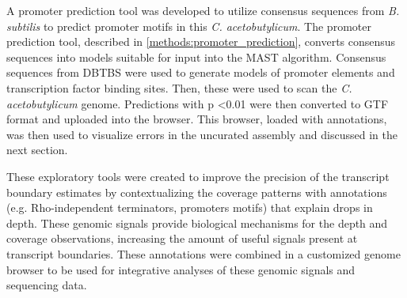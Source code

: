 A promoter prediction tool was developed to utilize consensus sequences from \textit{B. subtilis}\cite{189} to predict promoter motifs in this \textit{C. acetobutylicum}. The promoter prediction tool, described in \ref{methods:promoter_prediction}, converts consensus sequences into models suitable for input into the MAST algorithm.\cite{5} Consensus sequences from DBTBS\cite{189} were used to generate models of promoter elements and transcription factor binding sites. Then, these were used to scan the \textit{C. acetobutylicum} genome. Predictions with p \textless 0.01 were then converted to GTF format and uploaded into the browser. This browser, loaded with annotations, was then used to visualize errors in the uncurated assembly and discussed in the next section.

These exploratory tools were created to improve the precision of the transcript boundary estimates by contextualizing the coverage patterns with annotations (e.g. Rho-independent terminators, promoters motifs) that explain drops in depth. These genomic signals provide biological mechanisms for the depth and coverage observations, increasing the amount of useful signals present at transcript boundaries. These annotations were combined in a customized genome browser to be used for integrative analyses of these genomic signals and sequencing data. 




